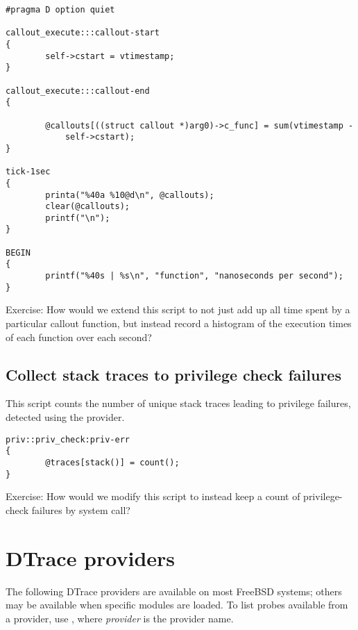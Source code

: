 \documentclass[a4paper,10pt]{article}
\begin{document}
\begin{small}
\begin{verbatim}
#pragma D option quiet

callout_execute:::callout-start
{
        self->cstart = vtimestamp;
}

callout_execute:::callout-end
{

        @callouts[((struct callout *)arg0)->c_func] = sum(vtimestamp -
            self->cstart);
}

tick-1sec
{
        printa("%40a %10@d\n", @callouts);
        clear(@callouts);
        printf("\n");
}

BEGIN
{
        printf("%40s | %s\n", "function", "nanoseconds per second");
}
\end{verbatim}
\end{small}

\noindent
Exercise: How would we extend this script to not just add up all time spent by
a particular callout function, but instead record a histogram of the execution
times of each function over each second?

\subsection*{Collect stack traces to privilege check failures}

This script counts the number of unique stack traces leading to privilege
failures, detected using the  provider.

\begin{small}
\begin{verbatim}
priv::priv_check:priv-err
{
        @traces[stack()] = count();
}
\end{verbatim}
\end{small}

\noindent
Exercise: How would we modify this script to instead keep a count of
privilege-check failures by system call?

\section*{DTrace providers}

The following DTrace providers are available on most FreeBSD systems; others
may be available when specific modules are loaded.
To list probes available from a provider, use ,
where \textit{provider} is the provider name.
\end{document}
